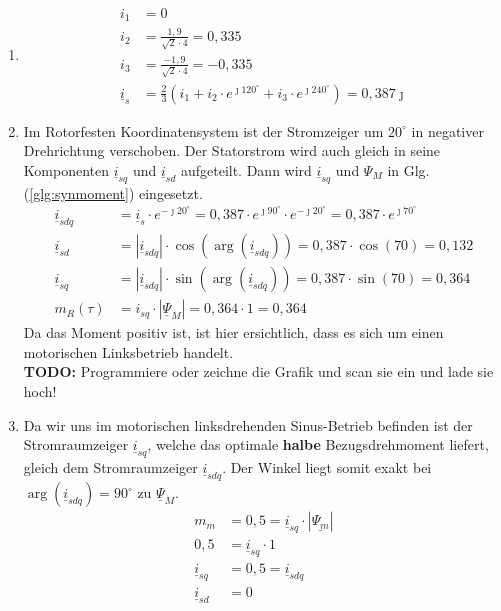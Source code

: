 \begin{solution}
\begin{enumerate}
\item 
\begin{align}
i_1 &= 0\\
i_2 &= \frac{1,9}{\sqrt{2} \cdot 4}= 0,335\\
i_3 &= \frac{-1,9}{\sqrt{2} \cdot 4}= -0,335\\
\underline{i}_s &= \frac{2}{3} \left ( i_1 + i_2 \cdot e^{\jmath 120^\circ} + i_3 \cdot e^{\jmath 240^\circ}  \right ) = 0,387 \jmath
\end{align}
\item Im Rotorfesten Koordinatensystem ist der Stromzeiger um $20^\circ$ in negativer Drehrichtung verschoben. Der Statorstrom wird auch gleich in seine Komponenten $\underline{i}_{sq}$ und $\underline{i}_{sd}$ aufgeteilt. Dann wird $\underline{i}_{sq}$ und $\Psi_M$ in Glg.(\ref{glg:synmoment}) eingesetzt.
\begin{align}
\underline{i}_{sdq} & = \underline{i}_s \cdot e^{-\jmath 20 ^\circ} = 0,387 \cdot e^{\jmath 90 ^\circ} \cdot e^{-\jmath 20 ^\circ} = 0,387 \cdot e^{\jmath 70 ^\circ} \\
\underline{i}_{sd} & = |\underline{i}_{sdq}| \cdot \cos(\arg(\underline{i}_{sdq})) = 0,387 \cdot \cos(70) = 0,132 \\
\underline{i}_{sq} & = |\underline{i}_{sdq}| \cdot \sin(\arg(\underline{i}_{sdq})) = 0,387 \cdot \sin(70) = 0,364 \\
m_R(\tau)& =  i_{sq} \cdot | \underline{\Psi}_M|= 0,364\cdot 1 = 0,364
\end{align}
Da das Moment positiv ist, ist hier ersichtlich, dass es sich um einen motorischen Linksbetrieb handelt.\\
\textbf{TODO:} Programmiere oder zeichne die Grafik und scan sie ein und lade sie hoch!
\item Da wir uns im motorischen linksdrehenden Sinus-Betrieb befinden ist der Stromraumzeiger $\underline{i}_{sq}$, welche das optimale \textbf{halbe} Bezugsdrehmoment liefert, gleich dem Stromraumzeiger $\underline{i}_{sdq}$. Der Winkel liegt somit exakt bei $\arg(\underline{i}_{sdq})=90^\circ$ zu $\underline{\Psi}_M$.
\begin{align}
m_m &= 0,5 = \underline{i}_{sq} \cdot |\underline{\Psi_m}|\\
0,5 &= \underline{i}_{sq} \cdot 1\\
\underline{i}_{sq} &= 0,5 = \underline{i}_{sdq} \\
\underline{i}_{sd} &= 0\\

\end{align}
\end{enumerate}
\end{solution}
